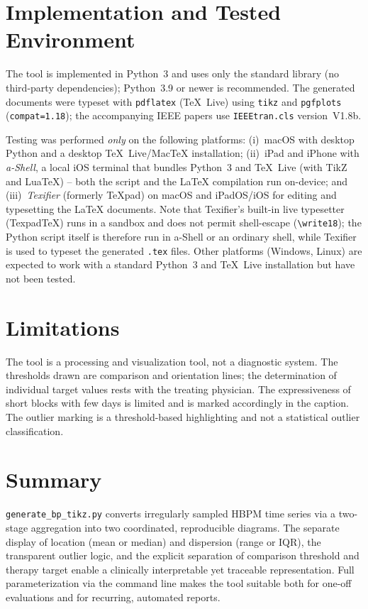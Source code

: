 \documentclass[conference]{IEEEtran}
\begin{document}
\section{Implementation and Tested Environment}
The tool is implemented in Python~3 and uses only the standard library (no
third-party dependencies); Python~3.9 or newer is recommended. The generated
documents were typeset with \texttt{pdflatex} (TeX~Live) using \texttt{tikz} and
\texttt{pgfplots} (\texttt{compat=1.18}); the accompanying IEEE papers use
\texttt{IEEEtran.cls} version~V1.8b.

Testing was performed \emph{only} on the following platforms: (i)~macOS with
desktop Python and a desktop TeX~Live/MacTeX installation; (ii)~iPad and iPhone
with \emph{a-Shell}, a local iOS terminal that bundles Python~3 and TeX~Live
(with TikZ and LuaTeX) -- both the script and the LaTeX compilation run
on-device; and (iii)~\emph{Texifier} (formerly TeXpad) on macOS and iPadOS/iOS
for editing and typesetting the LaTeX documents. Note that Texifier's built-in
live typesetter (TexpadTeX) runs in a sandbox and does not permit shell-escape
(\texttt{\textbackslash write18}); the Python script itself is therefore run in
a-Shell or an ordinary shell, while Texifier is used to typeset the generated
\texttt{.tex} files. Other platforms (Windows, Linux) are expected to work with a
standard Python~3 and TeX~Live installation but have not been tested.

\section{Limitations}
The tool is a processing and visualization tool, not a diagnostic system. The
thresholds drawn are comparison and orientation lines; the determination of
individual target values rests with the treating physician. The expressiveness
of short blocks with few days is limited and is marked accordingly in the
caption. The outlier marking is a threshold-based highlighting and not a
statistical outlier classification.

\section{Summary}
\texttt{generate\_bp\_tikz.py} converts irregularly sampled HBPM time series via
a two-stage aggregation into two coordinated, reproducible diagrams. The
separate display of location (mean or median) and dispersion (range or IQR), the
transparent outlier logic, and the explicit separation of comparison threshold
and therapy target enable a clinically interpretable yet traceable
representation. Full parameterization via the command line makes the tool
suitable both for one-off evaluations and for recurring, automated reports.
\end{document}
